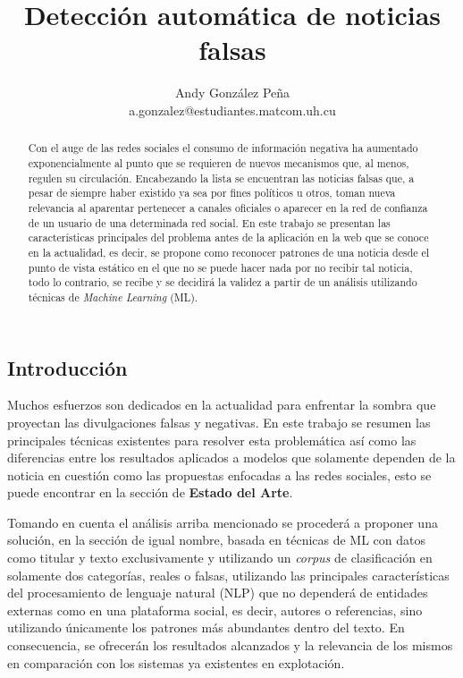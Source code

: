 \documentclass{llncs}
\begin{document}
\title{Detecci\'on autom\'atica de noticias falsas}

\author{Andy Gonz\'alez Pe\~na \\ a.gonzalez@estudiantes.matcom.uh.cu}

\maketitle


\begin{multicols}{2}[]

\begin{abstract}

Con el auge de las redes sociales el consumo de informaci\'on negativa ha aumentado exponencialmente al punto que se requieren de nuevos mecanismos
que, al menos, regulen su circulaci\'on. Encabezando la lista se encuentran las noticias falsas que, a pesar de siempre haber existido ya sea por fines pol\'iticos
u otros, toman nueva relevancia al aparentar pertenecer a canales oficiales o aparecer en la red de confianza de un usuario de una determinada red social.
En este trabajo se presentan las caracter\'isticas principales del problema antes de la aplicaci\'on en la web que se conoce en la actualidad, es decir, se propone
como reconocer patrones de una noticia desde el punto de vista est\'atico en el que no se puede hacer nada por no recibir tal noticia, todo lo contrario, se recibe
y se decidir\'a la validez a partir de un an\'alisis utilizando t\'ecnicas de \textit{Machine Learning} (ML).

\end{abstract}


\section{Introducci\'on}\label{sec:Introduction}

Muchos esfuerzos son dedicados en la actualidad para enfrentar la sombra que proyectan las divulgaciones falsas y negativas. En este trabajo se resumen las
principales t\'ecnicas existentes para resolver esta problem\'atica as\'i como las diferencias entre los resultados aplicados a modelos que solamente dependen de la
noticia en cuesti\'on como las propuestas enfocadas a las redes sociales, esto se puede encontrar en la secci\'on de \textbf{Estado del Arte}.

Tomando en cuenta el an\'alisis arriba mencionado se proceder\'a a proponer una soluci\'on, en la secci\'on de igual nombre, basada en t\'ecnicas de ML con datos como
titular y texto exclusivamente y utilizando un \textit{corpus} de clasificaci\'on en solamente dos categor\'ias, reales o falsas, utilizando las principales caracter\'isticas del
procesamiento de lenguaje natural (NLP) que no depender\'a de entidades externas como en una plataforma social, es decir, autores o referencias, sino utilizando \'unicamente 
los patrones m\'as abundantes dentro del texto. En consecuencia, se ofrecer\'an los resultados alcanzados y la relevancia de los mismos en comparaci\'on con los sistemas 
ya existentes en explotaci\'on.


\end{multicols}
\end{document}
